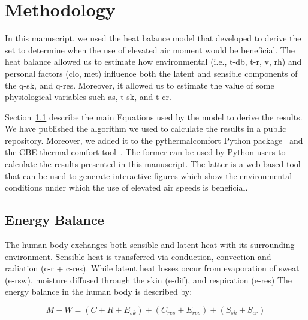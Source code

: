 
\section{Methodology}\label{sec:methodology}

In this manuscript, we used the heat balance model that  developed to derive the \ac{set} to determine when the use of elevated air moment would be beneficial.
The heat balance allowed us to estimate how environmental (i.e., \ac{t-db}, \ac{t-r}, \ac{v}, \ac{rh}) and personal factors (\ac{clo}, \ac{met}) influence both the latent and sensible components of the \ac{q-sk}, and \ac{q-res}.
Moreover, it allowed us to estimate the value of some physiological variables such as, \ac{t-sk}, and \ac{t-cr}.

Section~\ref{subsec:energy-balance} describe the main Equations used by the model to derive the results.
We have published the algorithm we used to calculate the results in a public repository.
Moreover, we added it to the pythermalcomfort Python package~\cite{Tartarini2020a} and the CBE thermal comfort tool~\cite{Tartarini2020}.
The former can be used by Python users to calculate the results presented in this manuscript.
The latter is a web-based tool that can be used to generate interactive figures which show the environmental conditions under which the use of elevated air speeds is beneficial.

\subsection{Energy Balance}\label{subsec:energy-balance}

The human body exchanges both sensible and latent heat with its surrounding environment.
Sensible heat is transferred via conduction, convection and radiation (\acs{c-r} + \acs{c-res}).
While latent heat losses occur from evaporation of sweat  (\acs{e-rsw}), moisture diffused through the skin  (\acs{e-dif}), and respiration (\acs{e-res})
The energy balance in the human body is described by:

\begin{equation}
    M - W = (C + R + E_{sk}) + (C_{res} + E_{res}) + (S_{sk} + S_{cr})\label{eq:heat-balance}
\end{equation}

